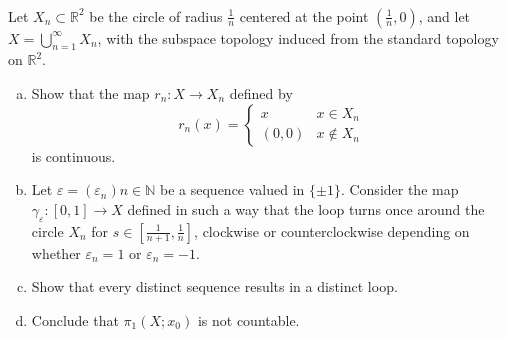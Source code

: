 \documentclass{article}
\newenvironment{problem}[2][Problem]{\begin{trivlist}
\item[\hskip \labelsep {\bfseries #1}\hskip \labelsep {\bfseries #2.}]}{\end{trivlist}}
\begin{document}
\begin{problem}{3} \text{} \\
  Let $X_n \subset \mathbb R^2$ be the circle of radius $\frac{1}{n}$ centered
  at the point $(\frac{1}{n}, 0)$, and let $X = \bigcup_{n=1}^\infty X_n$, with
  the subspace topology induced from the standard topology on $\mathbb R^2$.
  \begin{enumerate}[a.]
    \item Show that the map $r_n\colon X \rightarrow X_n$ defined by \[
      r_n(x) = \begin{cases}
        x      & x     \in X_n \\
        (0, 0) & x \not\in X_n
      \end{cases}
    \] is continuous.
    \item Let $\varepsilon = (\varepsilon_n){n\in\mathbb N}$ be a sequence
    valued in $\{ \pm 1 \}$. Consider the map
    $\gamma_\varepsilon\colon [0, 1] \rightarrow X$ defined in such a way that
    the loop turns once around the circle $X_n$ for $s \in \left[\frac{1}{n+1}, \frac{1}{n}\right]$,
    clockwise or counterclockwise depending on whether $\varepsilon_n = 1$ or
    $\varepsilon_n = -1$.
    \item Show that every distinct sequence results in a distinct loop.
    \item Conclude that $\pi_1(X; x_0)$ is not countable.
  \end{enumerate}
\end{problem}
\end{document}
